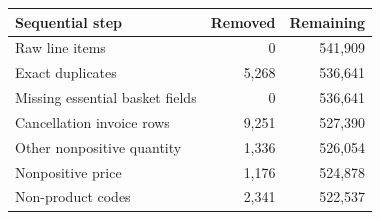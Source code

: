 \begin{tabular}{lrr}
\toprule
Sequential step & Removed & Remaining \\
\midrule
Raw line items & 0 & 541,909 \\
Exact duplicates & 5,268 & 536,641 \\
Missing essential basket fields & 0 & 536,641 \\
Cancellation invoice rows & 9,251 & 527,390 \\
Other nonpositive quantity & 1,336 & 526,054 \\
Nonpositive price & 1,176 & 524,878 \\
Non-product codes & 2,341 & 522,537 \\
\bottomrule
\end{tabular}
